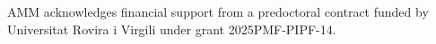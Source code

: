 \documentclass[11pt]{article}
\theoremstyle{plain}
\theoremstyle{definition}
\begin{document}
AMM acknowledges financial support from a predoctoral contract funded by Universitat Rovira i Virgili under grant 2025PMF-PIPF-14.





{\small
%

}

\end{document}
